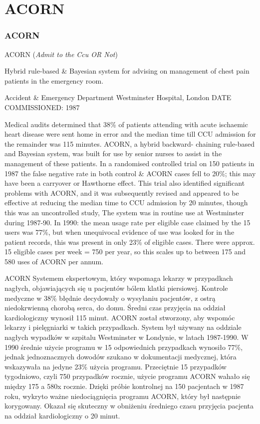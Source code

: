 \section{ACORN}

\begin{frame}
\frametitle{ACORN}
    
ACORN (\textit{Admit to the Ccu OR Not})

Hybrid rule-based \& Bayesian system for advising on management of chest pain patients in the emergency room.

Accident \& Emergency Department Westminster Hospital, London
DATE COMMISSIONED: 1987

Medical audits determined that 38\% of patients attending with acute ischaemic
heart disease were sent home in error and the median time till CCU admission
for the remainder was 115 minutes. ACORN, a hybrid backward- chaining
rule-based and Bayesian system, was built for use by senior nurses to assist in
the management of these patients. In a randomised controlled trial on 150
patients in 1987 the false negative rate in both control \& ACORN cases fell to
20\%; this may have been a carryover or Hawthorne effect. This trial also
identified significant problems with ACORN, and it was subsequently revised and
appeared to be effective at reducing the median time to CCU admission by 20
minutes, though this was an uncontrolled study{,}
The system was in routine use at Westminster during 1987-90. In 1990: the mean usage rate per eligible case claimed by the 15 users was 77\%, but when unequivocal evidence of use was looked for in the patient records, this was present in only 23\% of eligible cases. There were approx. 15 eligible cases per week = 750 per year, so this scales up to between 175 and 580 uses of ACORN per annum.


ACORN
Systemem ekspertowym, który wspomaga lekarzy w przypadkach nagłych,
objawiających się u pacjentów bólem klatki piersiowej. Kontrole medyczne w 38\%
błędnie decydowały o wysyłaniu pacjentów, z ostrą niedokrwienną chorobą serca, do
domu. Średni czas przyjęcia na oddział kardiologiczny wynosił 115 minut. ACORN
został stworzony, aby wspomóc lekarzy i pielęgniarki w takich przypadkach. System
był używany na oddziale nagłych wypadków w szpitalu Westminster w Londynie, w
latach 1987-1990. W 1990 średnie użycie programu w 15 odpowiednich przypadkach
wynosiło 77\%, jednak jednoznacznych dowodów szukano w dokumentacji
medycznej, która wskazywała na jedyne 23\% użycia programu. Przeciętnie 15
przypadków tygodniowo, czyli 750 przypadków rocznie, użycie programu ACORN
wahało się między 175 a 580x rocznie. Dzięki próbie kontrolnej na 150 pacjentach w
1987 roku, wykryto ważne niedociągnięcia programu ACORN, który był następnie
korygowany. Okazał się skuteczny w obniżeniu średniego czasu przyjęcia pacjenta na
oddział kardiologiczny o 20 minut.


\end{frame}
